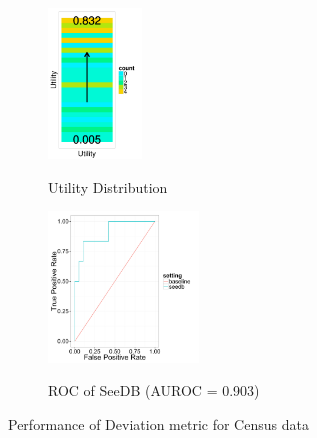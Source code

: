 

\begin{figure}[t]
	\centering
	\begin{subfigure}{0.32\linewidth}
		{\includegraphics[trim={0 1.3cm 0 0}, clip, width=2.5cm]{Images/census_gt_distribution.pdf}}
		\caption{Utility Distribution}
		\label{fig:gt_dist}
	\end{subfigure}
	\begin{subfigure}{0.65\linewidth}
		\centering 
		{\includegraphics[width=4cm] {Images/seedb_roc.pdf}} 
		\caption{ROC of SeeDB (AUROC = 0.903)}
		\label{fig:roc}
	\end{subfigure}
	\vspace{-10pt}
	\caption{Performance of Deviation metric for Census data}
	\vspace{-20pt}
	\label{fig:census_gt}
\end{figure}

